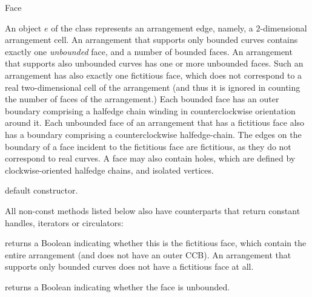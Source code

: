 
\ccRefPageBegin

\begin{ccRefClass}{Face}

\ccDefinition
An object $e$ of the class \ccRefName{} represents an arrangement edge,
namely, a $2$-dimensional arrangement cell. An arrangement that supports
only bounded curves contains exactly one \emph{unbounded} face, and a
number of bounded faces. An arrangement that supports also unbounded
curves has one or more unbounded faces. Such an arrangement has also
exactly one fictitious face, which does not correspond to a real
two-dimensional cell of the arrangement (and thus it is ignored in
counting the number of faces of the arrangement.)
Each bounded face has an outer boundary comprising a halfedge chain
winding in counterclockwise orientation around it. Each unbounded face of
an arrangement that has a fictitious face also has a boundary comprising
a counterclockwise halfedge-chain. The edges on the boundary of a face
incident to the fictitious face are fictitious, as they do not correspond
to real curves. A face may also contain holes, which are defined by
clockwise-oriented halfedge chains, and isolated vertices.

\ccInheritsFrom

\ccCreation
{}

   {default constructor.}    	    
    
\ccAccessFunctions

All non-const methods listed below also have  counterparts
that return constant handles, iterators or circulators:

  {returns a Boolean indicating whether this is the fictitious face,
  which contain the entire arrangement (and does not have an outer CCB).
  An arrangement that supports only bounded curves does not have a
  fictitious face at all.}

  {returns a Boolean indicating whether the face is unbounded.}    


\end{ccRefClass}
